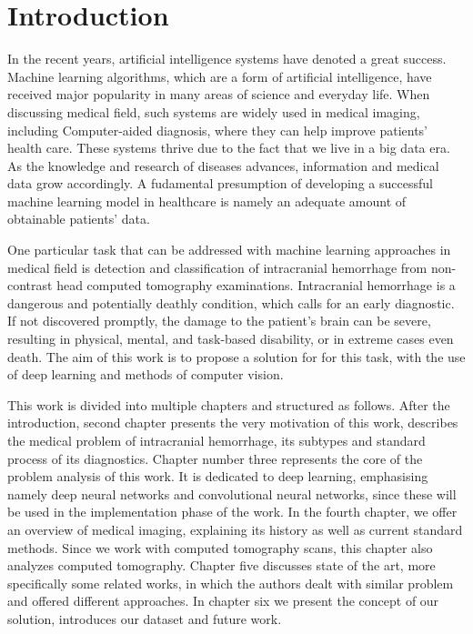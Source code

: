 \chapter{Introduction}


In the recent years, artificial intelligence systems have denoted a great success. Machine learning algorithms, which are a form of artificial intelligence, have received major popularity in many areas of science and everyday life. When discussing medical field, such systems are widely used in medical imaging, including Computer-aided diagnosis, where they can help improve patients’ health care. These systems thrive due to the fact that we live in a big data era. As the knowledge and research of diseases advances, information and medical data grow accordingly. A fudamental presumption of developing a successful machine learning model in healthcare is namely an adequate amount of obtainable patients' data.


One particular task that can be addressed with machine learning approaches in medical field is detection and classification of intracranial hemorrhage from non-contrast head computed tomography examinations. Intracranial hemorrhage is a dangerous and potentially deathly condition, which calls for an early diagnostic. If not discovered promptly, the damage to the patient's brain can be severe, resulting in physical, mental, and task-based disability, or in extreme cases even death. The aim of this work is to propose a solution for for this task, with the use of deep learning and methods of computer vision. 


This work is divided into multiple chapters and structured as follows. After the introduction, second chapter presents the very motivation of this work, describes the medical problem of intracranial hemorrhage, its subtypes and standard process of its diagnostics. Chapter number three represents the core of the problem analysis of this work. It is dedicated to deep learning, emphasising namely deep neural networks and convolutional neural networks, since these will be used in the implementation phase of the work. In the fourth chapter, we offer an overview of medical imaging, explaining its history as well as current standard methods. Since we work with computed tomography scans, this chapter also analyzes computed tomography. Chapter five discusses state of the art, more specifically some related works, in which the authors dealt with similar problem and offered different approaches. In chapter six we present the concept of our solution, introduces our dataset and future work.
